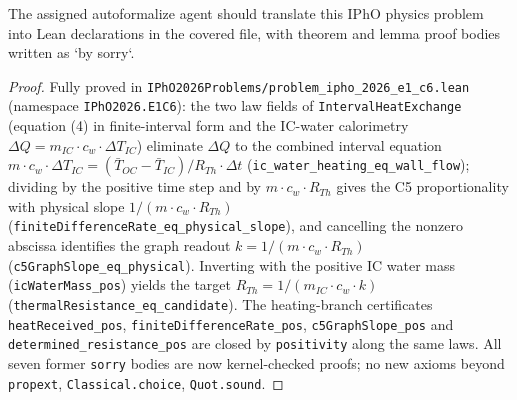 \begin{theorem}
\label{thm:physics:ipho_2026_e1_c6:target}
\leanok
The assigned autoformalize agent should translate this IPhO physics problem into Lean declarations in the covered file, with theorem and lemma proof bodies written as `by sorry`.
\end{theorem}
\begin{proof}
\leanok
Fully proved in \texttt{IPhO2026Problems/problem\_ipho\_2026\_e1\_c6.lean}
(namespace \texttt{IPhO2026.E1C6}): the two law fields of
\texttt{IntervalHeatExchange} (equation (4) in finite-interval form and the
IC-water calorimetry $\Delta Q = m_{IC} \cdot c_w \cdot \Delta T_{IC}$)
eliminate $\Delta Q$ to the combined interval equation
$m \cdot c_w \cdot \Delta T_{IC} = (\bar T_{OC} - \bar T_{IC})/R_{Th} \cdot \Delta t$
(\texttt{ic\_water\_heating\_eq\_wall\_flow}); dividing by the positive time
step and by $m \cdot c_w \cdot R_{Th}$ gives the C5 proportionality with
physical slope $1/(m \cdot c_w \cdot R_{Th})$
(\texttt{finiteDifferenceRate\_eq\_physical\_slope}), and cancelling the
nonzero abscissa identifies the graph readout $k = 1/(m \cdot c_w \cdot R_{Th})$
(\texttt{c5GraphSlope\_eq\_physical}). Inverting with the positive IC water
mass (\texttt{icWaterMass\_pos}) yields the target
$R_{Th} = 1/(m_{IC} \cdot c_w \cdot k)$
(\texttt{thermalResistance\_eq\_candidate}). The heating-branch certificates
\texttt{heatReceived\_pos}, \texttt{finiteDifferenceRate\_pos},
\texttt{c5GraphSlope\_pos} and \texttt{determined\_resistance\_pos} are closed
by \texttt{positivity} along the same laws. All seven former \texttt{sorry}
bodies are now kernel-checked proofs; no new axioms beyond
\texttt{propext}, \texttt{Classical.choice}, \texttt{Quot.sound}.
\end{proof}
